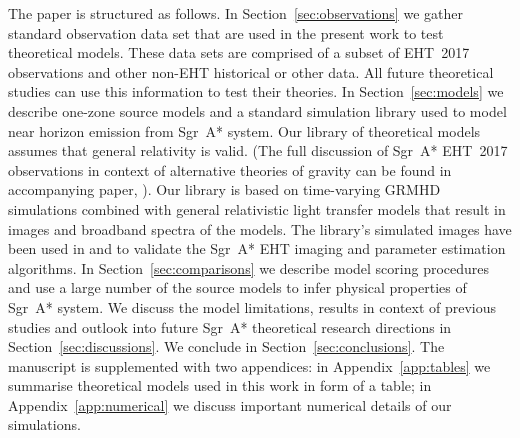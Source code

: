 The paper is structured as follows. In Section~\ref{sec:observations} we gather standard observation data set that are used in the present work to test theoretical models. These data sets are comprised of a subset of EHT~2017 observations and other non-EHT historical or other data. All future theoretical studies can use this information to test their theories. In Section~\ref{sec:models} we describe one-zone source models and a standard simulation library used to model near horizon emission from Sgr~A* system. Our library of theoretical models assumes that general relativity is valid. (The full discussion of Sgr~A* EHT~2017 observations in context of alternative theories of gravity can be found in accompanying paper, ).
Our library is based on time-varying GRMHD simulations combined with general relativistic light transfer models that result in images and broadband spectra of the models. The library's simulated images have been used in  and  to validate the Sgr~A* EHT imaging and parameter estimation algorithms.
In Section~\ref{sec:comparisons} we describe model scoring procedures and use a large number of the source models to infer physical properties of Sgr~A* system. We discuss the model limitations, results in context of previous studies and outlook into future Sgr~A* theoretical research directions in Section~\ref{sec:discussions}. We conclude in Section~\ref{sec:conclusions}.
The manuscript is supplemented with two appendices: in Appendix~\ref{app:tables} we summarise theoretical models used in this work in form of a table; in Appendix~\ref{app:numerical} we discuss important numerical details of our simulations.



